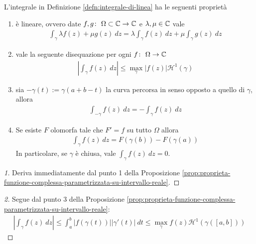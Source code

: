 \begin{proposition}
	\label{prop:proprieta-integrale-di-linea}
	L'integrale in Definizione \ref{defn:integrale-di-linea} ha le seguenti proprietà
	\begin{enumerate}
		\item è lineare, ovvero date $f,g \colon\ \Omega \subset \mathbb{C} \rightarrow \mathbb{C}$ e $\lambda, \mu \in \mathbb{C}$ vale
		\begin{equation*}
		\begin{aligned}
			\int_{\gamma} \lambda f(z) + \mu g(z) \ dz =  \lambda \int_{\gamma} f(z) \ dz + \mu \int_{\gamma} g(z) \ dz 
		\end{aligned}
		\end{equation*}
		\item vale la seguente disequazione per ogni $f \colon\ \Omega \rightarrow \mathbb{C}$
		\begin{equation*}
		\begin{aligned}
			\left|\int_{\gamma} f(z) \ dz\right| \le \max_{\gamma} |f(z)| \mathcal{H}^1(\gamma)	
		\end{aligned}
		\end{equation*}
		\item sia $-\gamma(t) := \gamma(a+b-t)$ la curva percorsa in senso opposto a quello di $\gamma$, allora
		\begin{equation*}
		\begin{aligned}
			\int_{-\gamma} f(z) \ dz = - \int_{\gamma} f(z) \ dz
		\end{aligned}
		\end{equation*}
		\item Se esiste $F$ olomorfa tale che $F' = f$ su tutto $\Omega$ allora
		\begin{equation*}
		\begin{aligned}
			\int_\gamma f(z) \ dz = F(\gamma(b)) - F(\gamma(a))
		\end{aligned}
		\end{equation*}
		In particolare, se $\gamma$ è chiusa, vale $\int_\gamma f(z)\ dz = 0$.
	\end{enumerate}
\end{proposition}
\begin{proof}[1]
	Deriva immediatamente dal punto 1 della Proposizione \ref{prop:proprieta-funzione-complessa-parametrizzata-su-intervallo-reale}.
\end{proof}
\begin{proof}[2]	
	Segue dal punto $3$ della Proposizione \ref{prop:proprieta-funzione-complessa-parametrizzata-su-intervallo-reale}:
	\begin{equation*}
	\begin{aligned}
		\left|\int_\gamma f(z)\ dz\right| \le \int^b_a |f(\gamma(t))||\gamma'(t)| \ dt \le \max_{\gamma} f(z) \mathcal{H}^1(\gamma(\left[a,b\right])) 
	\end{aligned}
	\end{equation*}
\end{proof}
